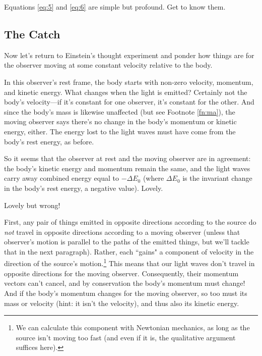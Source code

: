 \documentclass[12pt]{article}
\begin{document}
Equations \ref{eq:5} and \ref{eq:6} are simple but profound. Get to know them.

\subsection{The Catch}\label{ssec:tc}

Now let's return to Einstein's thought experiment and ponder how things are for the observer moving at some constant velocity relative to the body.

In this observer's rest frame, the body starts with non-zero velocity, momentum, and kinetic energy. What changes when the light is emitted? Certainly not the body's velocity---if it's constant for one observer, it's constant for the other. And since the body's mass is likewise unaffected (but see Footnote \ref{fn:ma}), the moving observer says there's no change in the body's momentum or kinetic energy, either. The energy lost to the light waves must have come from the body's rest energy, as before.

So it seems that the observer at rest and the moving observer are in agreement: the body's kinetic energy and momentum remain the same, and the light waves carry away combined energy equal to $-\Delta E_0$ (where $\Delta E_0$ is the invariant change in the body's rest energy, a negative value). Lovely.

Lovely but wrong!

First, any pair of things emitted in opposite directions according to the source do \emph{not} travel in opposite directions according to a moving observer (unless that observer's motion is parallel to the paths of the emitted things, but we'll tackle that in the next paragraph). Rather, each ``gains" a component of velocity in the direction of the source's motion.\footnote{We can calculate this component with Newtonian mechanics, as long as the source isn't moving too fast (and even if it is, the qualitative argument suffices here).} This means that our light waves don't travel in opposite directions for the moving observer. Consequently, their momentum vectors can't cancel, and by conservation the body's momentum must change! And if the body's momentum changes for the moving observer, so too must its mass or velocity (hint: it isn't the velocity), and thus also its kinetic energy.
\end{document}
